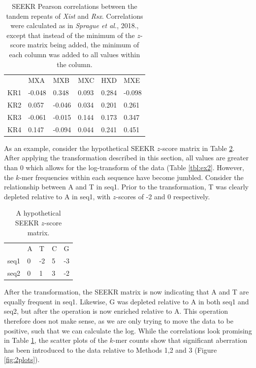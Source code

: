 \begin{table}[ht]
\begin{center}
\begin{tabular}{llllll}
&MXA & MXB                  & MXC                   & HXD                 & MXE                                      \\
KR1 & -0.048 & 0.348    & 0.093 & 0.284  & -0.098 \\
KR2 & 0.057  & -0.046 & 0.034 & 0.201 & 0.261  \\
KR3 & -0.061 & -0.015 & 0.144 & 0.173 & 0.347  \\
KR4 & 0.147   & -0.094  & 0.044 & 0.241 & 0.451 
\end{tabular}
\caption[Column-wise minimum addition to $z$-scores]{SEEKR Pearson correlations between the tandem repeats of \emph{Xist} and \emph{Rsx}. Correlations were calculated as in \emph{Sprague et al.}, 2018., except that instead of the minimum of the $z$-score matrix being added, the minimum of each column was added to all values within the column.}
\label{tbl:kmers4}
\end{center}
\end{table}
As an example, consider the hypothetical SEEKR $z$-score matrix in Table \ref{tbl:ex1}. After applying the transformation described in this section, all values are greater than 0 which allows for the log-transform of the data (Table \ref{tbl:ex2}. However, the $k$-mer frequencies within each sequence have become jumbled. Consider the relationship between A and T in seq1. Prior to the transformation, T was clearly depleted relative to A in seq1, with $z$-scores of -2 and 0 respectively. 
\begin{table}[h!]
\begin{center}
\begin{tabular}{lllll}
&A & T                   & C                  & G                                                    \\
seq1 & 0 & -2   & 5  & -3 \\
seq2 & 0   & 1 & 3 & -2 
\end{tabular}
\caption{A hypothetical SEEKR $z$-score matrix.}
\label{tbl:ex1}
\end{center}
\end{table}
After the transformation, the SEEKR matrix is now indicating that A and T are equally frequent in seq1. Likewise, G was depleted relative to A in both seq1 and seq2, but after the operation is now enriched relative to A.  This operation therefore does not make sense, as we are only trying to move the data to be positive, such that we can calculate the log. While the correlations look promising in Table \ref{tbl:kmers4}, the scatter plots of the $k$-mer counts show that  significant aberration has been introduced to the data relative to Methods 1,2 and 3 (Figure \ref{fig:2plots}). 


